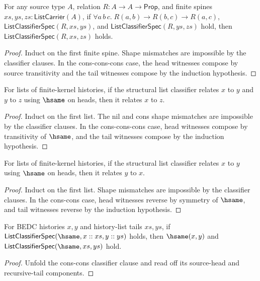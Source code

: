 \begin{theorem}
\label{thm:list-classifier-transitivity}
For any source type $A$, relation $R:A\to A\to\mathsf{Prop}$, and finite spines $xs,ys,zs:\mathsf{ListCarrier}(A)$, if
$\forall a\,b\,c.\;R(a,b)\to R(b,c)\to R(a,c)$,
$\mathsf{ListClassifierSpec}(R,xs,ys)$, and
$\mathsf{ListClassifierSpec}(R,ys,zs)$ hold, then
$\mathsf{ListClassifierSpec}(R,xs,zs)$ holds.
\end{theorem}
\begin{proof}
Induct on the first finite spine. Shape mismatches are impossible by the classifier clauses. In the cons-cons-cons case, the head witnesses compose by source transitivity and the tail witnesses compose by the induction hypothesis.
\end{proof}

\begin{theorem}
\label{thm:list-classifier-hsame-trans}
For lists of finite-kernel histories, if the structural list classifier relates \(x\) to \(y\) and \(y\) to \(z\) using \(\hsame\) on heads, then it relates \(x\) to \(z\).
\end{theorem}
\begin{proof}
Induct on the first list. The nil and cons shape mismatches are impossible by the classifier clauses. In the cons-cons-cons case, head witnesses compose by transitivity of \(\hsame\), and the tail witnesses compose by the induction hypothesis.
\end{proof}

\begin{theorem}
\label{thm:list-classifier-hsame-symm}
For lists of finite-kernel histories, if the structural list classifier relates \(x\) to \(y\) using \(\hsame\) on heads, then it relates \(y\) to \(x\).
\end{theorem}
\begin{proof}
Induct on the first list. Shape mismatches are impossible by the classifier clauses. In the cons-cons case, head witnesses reverse by symmetry of \(\hsame\), and tail witnesses reverse by the induction hypothesis.
\end{proof}

\begin{theorem}
\label{thm:list-classifier-hsame-cons-inversion}
For BEDC histories $x,y$ and history-list tails $xs,ys$, if
$\mathsf{ListClassifierSpec}(\hsame,x::xs,y::ys)$ holds, then $\hsame(x,y)$
and $\mathsf{ListClassifierSpec}(\hsame,xs,ys)$ hold.
\end{theorem}
\begin{proof}
Unfold the cons-cons classifier clause and read off its source-head and
recursive-tail components.
\end{proof}

